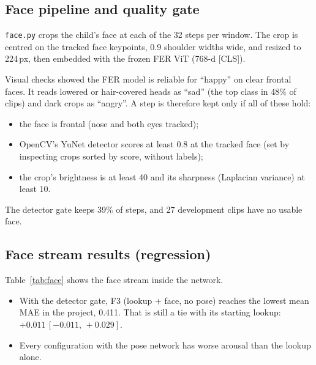 \documentclass[11pt]{article}
\newcommand{\code}[1]{\texttt{#1}}
\newcommand{\ci}[2]{\,[#1,\,#2]}
\begin{document}
\subsection{Face pipeline and quality gate}
\code{face.py} crops the child's face at each of the 32 steps per window. The crop is centred on the tracked face keypoints, 0.9 shoulder widths wide, and resized to 224\,px, then embedded with the frozen FER ViT (768-d [CLS]).

Visual checks showed the FER model is reliable for ``happy'' on clear frontal faces. It reads lowered or hair-covered heads as ``sad'' (the top class in 48\% of clips) and dark crops as ``angry''. A step is therefore kept only if all of these hold:
\begin{itemize}
  \item the face is frontal (nose and both eyes tracked);
  \item OpenCV's YuNet detector scores at least 0.8 at the tracked face (set by inspecting crops sorted by score, without labels);
  \item the crop's brightness is at least 40 and its sharpness (Laplacian variance) at least 10.
\end{itemize}
The detector gate keeps 39\% of steps, and 27 development clips have no usable face.

\subsection{Face stream results (regression)}
Table~\ref{tab:face} shows the face stream inside the network.
\begin{itemize}
  \item With the detector gate, F3 (lookup + face, no pose) reaches the lowest mean MAE in the project, 0.411. That is still a tie with its starting lookup: $+0.011\ci{-0.011}{+0.029}$.
  \item Every configuration with the pose network has worse arousal than the lookup alone.
\end{itemize}
\end{document}
